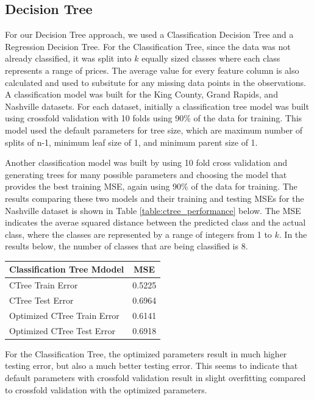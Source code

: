 \documentclass[10pt]{article}
\begin{document}
\begin{multicols}{2}
		\subsection{Decision Tree}
		For our Decision Tree approach, we used a Classification Decision Tree and a Regression Decision Tree. For the Classification Tree, since the data was not already classified, it was split into \(k\) equally sized classes where each class represents a range of prices. The average value for every feature column is also calculated and used to subsitute for any missing data points in the observations. A classification model was built for the King County, Grand Rapids, and Nashville datasets. For each dataset, initially a classification tree model was built using crossfold validation with 10 folds using 90\% of the data for training. This model used the default parameters for tree size, which are maximum number of splits of n-1, minimum leaf size of 1, and minimum parent size of 1. 

		Another classification model was built by using 10 fold cross validation and generating trees for many possible parameters and choosing the model that provides the best training MSE, again using 90\% of the data for training. The results comparing these two models and their training and testing MSEs for the Nashville dataset is shown in Table \ref{table:ctree_performance} below. The MSE indicates the averae squared distance between the predicted class and the actual class, where the classes are represented by a range of integers from 1 to \(k\). In the results below, the number of classes that are being classified is 8.

		\begin{center}
		\captionsetup{type=table}
			\begin{tabular}{l|c}
				Classification Tree Mdodel	& MSE \\
				\hline
				CTree Train Error 			& 0.5225 \\
				CTree Test Error			& 0.6964 \\
				Optimized CTree Train Error & 0.6141 \\
				Optimized CTree Test Error	& 0.6918 \\
			\end{tabular}
			\label{table:ctree_performance}        
		\end{center}

		For the Classification Tree, the optimized parameters result in much higher testing error, but also a much better testing error. This seems to indicate that default parameters with crossfold validation result in slight overfitting compared to crossfold validation with the optimized parameters.


\end{multicols}
\end{document}
